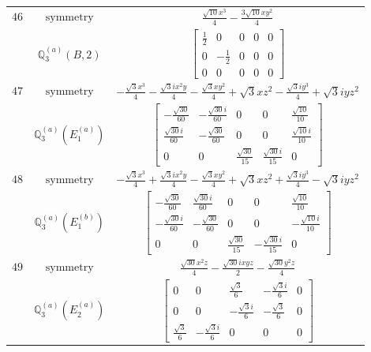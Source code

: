\documentclass[fleqn,8pt,landscape]{jsarticle}
\begin{document}
\begin{longtable}{ccc}
$ 46 $ & $ \text{symmetry} $ & $ \frac{\sqrt{10} x^{3}}{4} - \frac{3 \sqrt{10} x y^{2}}{4} $ \\
$  $ & $ \mathbb{Q}_{3}^{(a)}(B,2) $ & $ \begin{bmatrix} \frac{1}{2} & 0 & 0 & 0 & 0 \\ 0 & - \frac{1}{2} & 0 & 0 & 0 \\ 0 & 0 & 0 & 0 & 0 \end{bmatrix} $ \\ \hline
$ 47 $ & $ \text{symmetry} $ & $ - \frac{\sqrt{3} x^{3}}{4} - \frac{\sqrt{3} i x^{2} y}{4} - \frac{\sqrt{3} x y^{2}}{4} + \sqrt{3} x z^{2} - \frac{\sqrt{3} i y^{3}}{4} + \sqrt{3} i y z^{2} $ \\
$  $ & $ \mathbb{Q}_{3}^{(a)}(E_{1}^{(a)}) $ & $ \begin{bmatrix} - \frac{\sqrt{30}}{60} & - \frac{\sqrt{30} i}{60} & 0 & 0 & \frac{\sqrt{10}}{10} \\ \frac{\sqrt{30} i}{60} & - \frac{\sqrt{30}}{60} & 0 & 0 & \frac{\sqrt{10} i}{10} \\ 0 & 0 & \frac{\sqrt{30}}{15} & \frac{\sqrt{30} i}{15} & 0 \end{bmatrix} $ \\ \hline
$ 48 $ & $ \text{symmetry} $ & $ - \frac{\sqrt{3} x^{3}}{4} + \frac{\sqrt{3} i x^{2} y}{4} - \frac{\sqrt{3} x y^{2}}{4} + \sqrt{3} x z^{2} + \frac{\sqrt{3} i y^{3}}{4} - \sqrt{3} i y z^{2} $ \\
$  $ & $ \mathbb{Q}_{3}^{(a)}(E_{1}^{(b)}) $ & $ \begin{bmatrix} - \frac{\sqrt{30}}{60} & \frac{\sqrt{30} i}{60} & 0 & 0 & \frac{\sqrt{10}}{10} \\ - \frac{\sqrt{30} i}{60} & - \frac{\sqrt{30}}{60} & 0 & 0 & - \frac{\sqrt{10} i}{10} \\ 0 & 0 & \frac{\sqrt{30}}{15} & - \frac{\sqrt{30} i}{15} & 0 \end{bmatrix} $ \\ \hline
$ 49 $ & $ \text{symmetry} $ & $ \frac{\sqrt{30} x^{2} z}{4} - \frac{\sqrt{30} i x y z}{2} - \frac{\sqrt{30} y^{2} z}{4} $ \\
$  $ & $ \mathbb{Q}_{3}^{(a)}(E_{2}^{(a)}) $ & $ \begin{bmatrix} 0 & 0 & \frac{\sqrt{3}}{6} & - \frac{\sqrt{3} i}{6} & 0 \\ 0 & 0 & - \frac{\sqrt{3} i}{6} & - \frac{\sqrt{3}}{6} & 0 \\ \frac{\sqrt{3}}{6} & - \frac{\sqrt{3} i}{6} & 0 & 0 & 0 \end{bmatrix} $ \\ \hline

\end{longtable}
\end{document}
